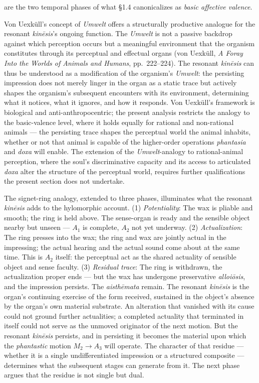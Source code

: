 are the two temporal phases of what \S 1.4 canonicalizes as \textit{basic affective valence}.

Von Uexküll's concept of \textit{Umwelt} offers a structurally productive analogue for the resonant \textit{kinēsis}'s ongoing function. The \textit{Umwelt} is not a passive backdrop against which perception occurs but a meaningful environment that the organism constitutes through its perceptual and effectual organs (von Uexküll, \textit{A Foray Into the Worlds of Animals and Humans}, pp.~222--224). The resonant \textit{kinēsis} can thus be understood as a modification of the organism's \textit{Umwelt}: the persisting impression does not merely linger in the organ as a static trace but actively shapes the organism's subsequent encounters with its environment, determining what it notices, what it ignores, and how it responds. Von Uexküll's framework is biological and anti-anthropocentric; the present analysis restricts the analogy to the basic-valence level, where it holds equally for rational and non-rational animals --- the persisting trace shapes the perceptual world the animal inhabits, whether or not that animal is capable of the higher-order operations \textit{phantasia} and \textit{doxa} will enable. The extension of the \textit{Umwelt}-analogy to rational-animal perception, where the soul's discriminative capacity and its access to articulated \textit{doxa} alter the structure of the perceptual world, requires further qualifications the present section does not undertake.

The signet-ring analogy, extended to three phases, illuminates what the resonant \textit{kinēsis} adds to the hylomorphic account. (1) \textit{Potentiality}: The wax is pliable and smooth; the ring is held above. The sense-organ is ready and the sensible object nearby but unseen --- $A_1$ is complete, $A_2$ not yet underway. (2) \textit{Actualization}: The ring presses into the wax; the ring and wax are jointly actual in the impressing; the actual hearing and the actual sound come about at the same time. This is $A_2$ itself: the perceptual act as the shared actuality of sensible object and sense faculty. (3) \textit{Residual trace}: The ring is withdrawn, the actualization proper ends --- but the wax has undergone preservative \textit{alloiōsis}, and the impression persists. The \textit{aisthēmata} remain. The resonant \textit{kinēsis} is the organ's continuing exercise of the form received, sustained in the object's absence by the organ's own material substrate. An alteration that vanished with its cause could not ground further actualities; a completed actuality that terminated in itself could not serve as the unmoved originator of the next motion. But the resonant \textit{kinēsis} persists, and in persisting it becomes the material upon which the \textit{phantastic} motion $M_2 \rightarrow A_3$ will operate. The character of that residue --- whether it is a single undifferentiated impression or a structured composite --- determines what the subsequent stages can generate from it. The next phase argues that the residue is not single but dual.

